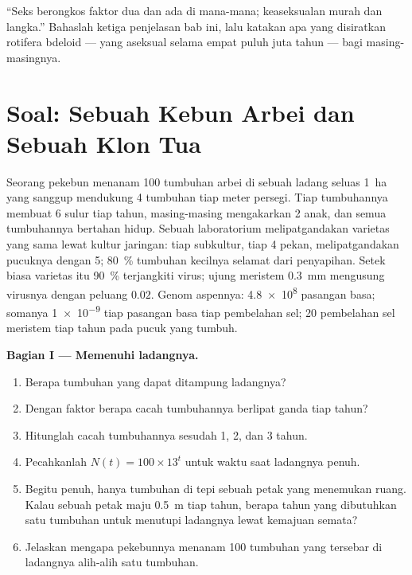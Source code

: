 \begin{exercise}[$\star\star\star$]\label{exo:b2:asexual-reproduction:12}
``Seks berongkos faktor dua dan ada di mana-mana; keaseksualan murah
dan langka.'' Bahaslah ketiga penjelasan bab ini, lalu katakan apa yang
disiratkan rotifera bdeloid --- yang aseksual selama empat puluh juta
tahun --- bagi masing-masingnya.
\end{exercise}

\section{Soal: Sebuah Kebun Arbei dan Sebuah Klon Tua}

\begin{problem}
\label{pb:b2:asexual-reproduction:1}
Seorang pekebun menanam \num{100} tumbuhan arbei di sebuah ladang
seluas \qty{1}{ha} yang sanggup mendukung \num{4} tumbuhan tiap meter
persegi. Tiap tumbuhannya membuat \num{6} sulur tiap tahun,
masing-masing mengakarkan \num{2} anak, dan semua tumbuhannya bertahan
hidup. Sebuah laboratorium melipatgandakan varietas yang sama lewat
kultur jaringan: tiap subkultur, tiap \num{4} pekan, melipatgandakan
pucuknya dengan \num{5}; \qty{80}{\%} tumbuhan kecilnya selamat dari
penyapihan. Setek biasa varietas itu \qty{90}{\%} terjangkiti virus;
ujung meristem \qty{0.3}{mm} mengusung virusnya dengan peluang
$0.02$. Genom aspennya: \qty{4.8e8}{} pasangan basa; 
somanya \qty{1e-9}{} tiap pasangan basa tiap pembelahan sel; \num{20}
pembelahan sel meristem tiap tahun pada pucuk yang tumbuh.

\medskip
\noindent\textbf{Bagian I --- Memenuhi ladangnya.}
\begin{enumerate}
  \item Berapa tumbuhan yang dapat ditampung ladangnya?
  \item Dengan faktor berapa cacah tumbuhannya berlipat ganda tiap
        tahun?
  \item Hitunglah cacah tumbuhannya sesudah 1, 2, dan 3 tahun.
  \item Pecahkanlah $N(t) = 100\times 13^{t}$ untuk waktu saat
        ladangnya penuh.
  \item Begitu penuh, hanya tumbuhan di tepi sebuah petak yang
        menemukan ruang. Kalau sebuah petak maju \qty{0.5}{m} tiap
        tahun, berapa tahun yang dibutuhkan satu tumbuhan untuk
        menutupi ladangnya lewat kemajuan semata?
  \item Jelaskan mengapa pekebunnya menanam \num{100} tumbuhan yang
        tersebar di ladangnya alih-alih satu tumbuhan.
\end{enumerate}


\end{problem}
